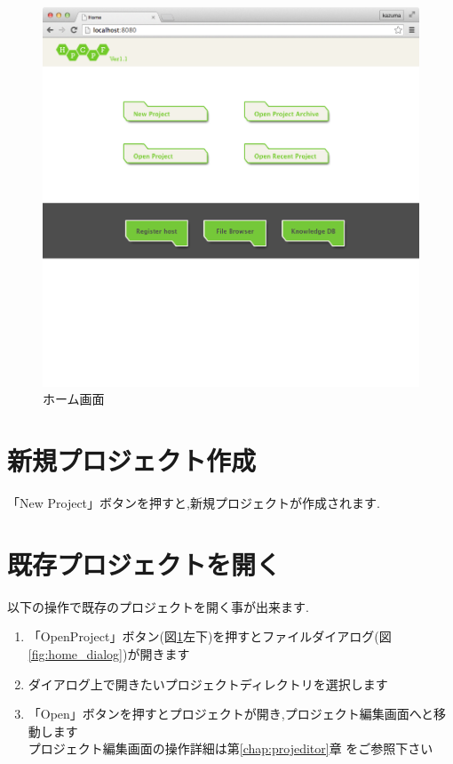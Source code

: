 \documentclass[a4paper,10pt,oneside]{jsbook}
\begin{document}
\begin{figure}[htbp]
	\begin{center}
		\includegraphics[width=11.5cm]{image/home_000.png}
	\end{center}
	\caption{ホーム画面}
	\label{fig:home}
\end{figure}


\section{新規プロジェクト作成}
「New Project」ボタンを押すと,新規プロジェクトが作成されます.

\section{既存プロジェクトを開く}
以下の操作で既存のプロジェクトを開く事が出来ます.
\begin{enumerate}
	\item 「OpenProject」ボタン(図\ref{fig:home}左下)を押すとファイルダイアログ(図\ref{fig:home_dialog})が開きます
	\item ダイアログ上で開きたいプロジェクトディレクトリを選択します
	\item 「Open」ボタンを押すとプロジェクトが開き,プロジェクト編集画面へと移動します\\
			プロジェクト編集画面の操作詳細は第\ref{chap:projeditor}章 をご参照下さい
\end{enumerate}
\end{document}

